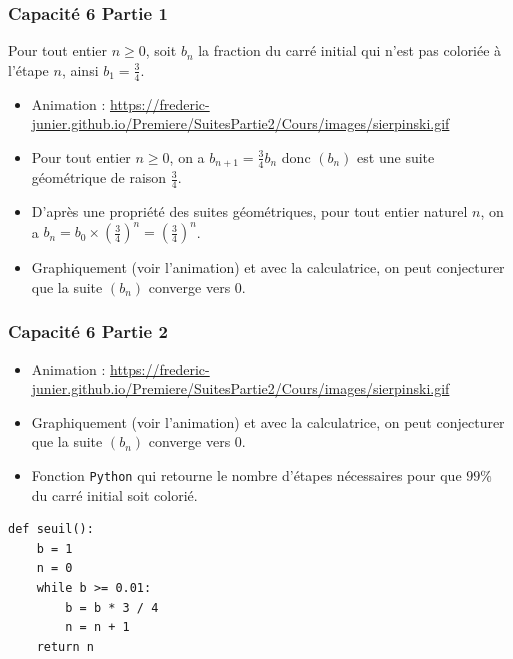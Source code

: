 \documentclass[11pt, hyperref={urlcolor=red,%
            linkcolor=blue, %
            colorlinks=true}]{beamer}
\newcommand{\suite}[1]{\ensuremath{\left(#1_{n}\right)}}
\begin{document}
 






\begin{frame}
\frametitle{Capacité 6 Partie 1}
\label{capacite6}
Pour tout entier $n \geqslant 0$, soit $b_{n}$ la fraction du carré initial qui n'est pas coloriée à l'étape $n$, ainsi $b_{1}=\frac{3}{4}$.
\begin{itemize}
\pause	\item Animation : \href{https://frederic-junier.github.io/Premiere/SuitesPartie2/Cours/images/sierpinski.gif}{https://frederic-junier.github.io/Premiere/SuitesPartie2/Cours/images/sierpinski.gif}
 \pause   \item Pour tout entier $n \geqslant 0$, on a  $b_{n+1}=\frac{3}{4}b_{n}$ donc $\suite{b}$ est une suite géométrique de raison $\frac{3}{4}$.
 \pause   \item D'après une propriété des suites géométriques, pour tout entier naturel $n$, on a $b_{n}=b_{0}\times \left(\frac{3}{4}\right)^{n}=\left(\frac{3}{4}\right)^{n}$.
\pause    \item Graphiquement (voir l'animation) et avec la calculatrice, on peut conjecturer que la suite $\suite{b}$ converge vers $0$.
 
\end{itemize}



\end{frame}



\begin{frame}[fragile]
\frametitle{Capacité 6 Partie 2}

\begin{itemize}
	\item Animation : \href{https://frederic-junier.github.io/Premiere/SuitesPartie2/Cours/images/sierpinski.gif}{https://frederic-junier.github.io/Premiere/SuitesPartie2/Cours/images/sierpinski.gif}
    \item Graphiquement (voir l'animation) et avec la calculatrice, on peut conjecturer que la suite $\suite{b}$ converge vers $0$.
    \item Fonction \texttt{Python} qui retourne le nombre d'étapes nécessaires pour que $99\%$ du carré initial soit colorié.
\end{itemize}


\begin{lstlisting}[style=rond]
def seuil():
	b = 1
	n = 0
	while b >= 0.01:
		b = b * 3 / 4
		n = n + 1
	return n
\end{lstlisting}
\end{frame}
\end{document}
